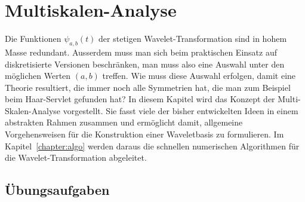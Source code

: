%
%
%
\chapter{Multiskalen-Analyse
\label{chapter:msa}}
Die Funktionen $\psi_{a,b}(t)$ der stetigen Wavelet-Transformation
sind in hohem Masse redundant.
Ausserdem muss man sich beim praktischen Einsatz auf diskretisierte 
Versionen beschränken, man muss also eine Auswahl unter den möglichen
Werten $(a,b)$ treffen.
Wie muss diese Auswahl erfolgen, damit eine Theorie resultiert, die
immer noch alle Symmetrien hat, die man zum Beispiel beim Haar-Servlet
gefunden hat?
In diesem Kapitel wird das Konzept der Multi-Skalen-Analyse vorgestellt.
Sie fasst viele der bisher entwickelten Ideen in einem abstrakten
Rahmen zusammen und ermöglicht damit, allgemeine Vorgehensweisen für die
Konstruktion einer Waveletbasis zu formulieren.
Im Kapitel~\ref{chapter:algo} werden daraus die schnellen numerischen
Algorithmen für die Wavelet-Transformation abgeleitet.





\section*{Übungsaufgaben}

